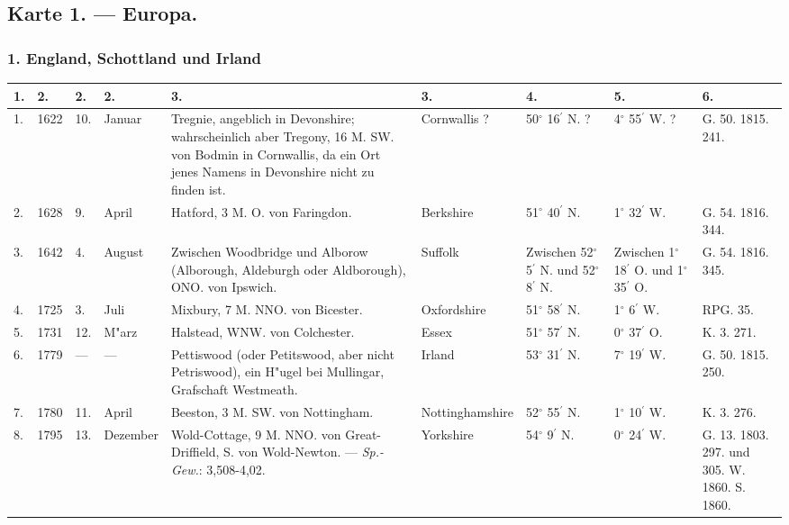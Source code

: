 \documentclass[a4paper, 8pt, oneside, polutonikogreek, german]{article}
\begin{document}
\subsection{Karte 1. --- Europa.}
\subsubsection{1. England, Schottland und Irland}
\begin{center}
    \footnotesize
    \begin{longtable}{|p{3mm}|p{7mm}|p{3mm}|p{11mm}|p{30mm}|p{20mm}|p{11mm}|p{11mm}|p{11mm}|}
    \hline
        1. & 2. & 2. & 2. & 3. & 3. & 4. & 5. & 6. \\ \hline
        1. & 1622 & 10. & Januar & Tregnie, angeblich in Devonshire; wahrscheinlich aber Tregony, 16 M. SW. von Bodmin in Cornwallis, da ein Ort jenes Namens in Devonshire nicht zu finden ist. & Cornwallis ? & 50$^\circ$ 16$^\prime$ N. ? & 4$^\circ$ 55$^\prime$ W. ? & G. 50. 1815. 241. \\ \hline
        2. & 1628 & 9. & April & Hatford, 3 M. O. von Faringdon. & Berkshire & 51$^\circ$ 40$^\prime$ N. & 1$^\circ$ 32$^\prime$ W. & G. 54. 1816. 344. \\ \hline
        3. & 1642 & 4. & August & Zwischen Woodbridge und Alborow (Alborough, Aldeburgh oder Aldborough), ONO. von Ipswich. & Suffolk & Zwischen 52$^\circ$ 5$^\prime$ N. und 52$^\circ$ 8$^\prime$ N. & Zwischen 1$^\circ$ 18$^\prime$ O. und 1$^\circ$ 35$^\prime$ O. & G. 54. 1816. 345. \\ \hline
        4. & 1725 & 3. & Juli & Mixbury, 7 M. NNO. von Bicester. & Oxfordshire & 51$^\circ$ 58$^\prime$ N. & 1$^\circ$ 6$^\prime$ W. & RPG. 35. \\ \hline
        5. & 1731 & 12. & M"arz & Halstead, WNW. von Colchester. & Essex & 51$^\circ$ 57$^\prime$ N. & 0$^\circ$ 37$^\prime$ O. & K. 3. 271. \\ \hline
        6. & 1779 & --- & --- & Pettiswood (oder Petitswood, aber nicht Petriswood), ein H"ugel bei Mullingar, Grafschaft Westmeath. & Irland & 53$^\circ$ 31$^\prime$ N. & 7$^\circ$ 19$^\prime$ W. & G. 50. 1815. 250. \\ \hline
        7. & 1780 & 11. & April & Beeston, 3 M. SW. von Nottingham. & Nottinghamshire & 52$^\circ$ 55$^\prime$ N. & 1$^\circ$ 10$^\prime$ W. & K. 3. 276. \\ \hline
        8. & 1795 & 13. & Dezember & Wold-Cottage, 9 M. NNO. von Great-Driffield, S. von Wold-Newton. --- \emph{Sp.-Gew.}: 3,508-4,02. & Yorkshire & 54$^\circ$ 9$^\prime$ N. & 0$^\circ$ 24$^\prime$ W. & G. 13. 1803. 297. und 305. W. 1860. S. 1860. \\ \hline

\end{longtable}
\end{center}
\end{document}
